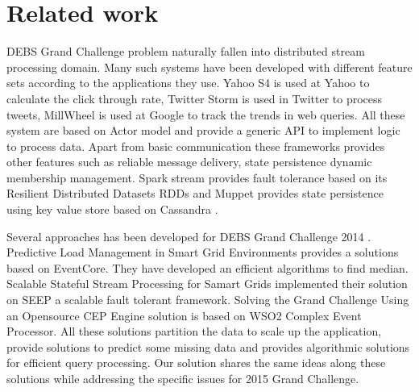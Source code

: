 \section{Related work}
DEBS Grand Challenge problem naturally fallen into distributed stream processing domain. Many such systems have been developed with different feature sets according to the applications they use. Yahoo S4 \cite{neumeyer2010s4} is used at Yahoo to calculate the click through rate, Twitter Storm \cite{toshniwal2014storm} is used in Twitter to process tweets, MillWheel \cite{akidau2013millwheel} is used at Google to track the trends in web queries. All these system are based on Actor model \cite{agha1985actors} and provide a generic API to implement logic to process data. Apart from basic communication these frameworks provides other features such as reliable message delivery, state persistence dynamic membership management. Spark stream \cite{zaharia2012discretized} provides fault tolerance based on its Resilient Distributed Datasets RDDs \cite{zaharia2012resilient} and Muppet \cite{lam2012muppet} provides state persistence using key value store based on Cassandra \cite{lakshman2010cassandra}. 

Several approaches has been developed for DEBS Grand Challenge 2014 \cite{jerzak2014debs}. Predictive Load Management in Smart Grid Environments \cite{mutschler2014predictive} provides a solutions based on EventCore. They have developed an efficient algorithms to find median. Scalable Stateful Stream Processing for Samart Grids \cite{fernandez2014scalable} implemented their solution on SEEP \cite{castro2013integrating} a scalable fault tolerant framework. Solving the Grand Challenge Using an Opensource CEP Engine \cite{perera2014solving} solution is based on WSO2 Complex Event Processor. All these solutions partition the data to scale up the application, provide solutions to predict some missing data and provides algorithmic solutions for efficient query processing. Our solution shares the same ideas along these solutions while addressing the specific issues for 2015 Grand Challenge.
